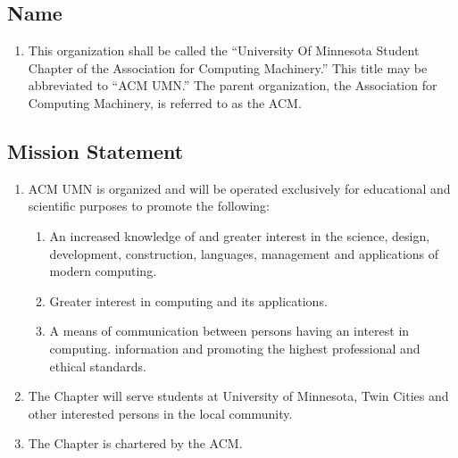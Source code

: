 \subsection{Name}
\begin{enumerate}
	\item This organization shall be called the ``University Of Minnesota Student Chapter of the Association for Computing Machinery.'' This title may be abbreviated to ``ACM UMN.'' The parent organization, the Association for Computing Machinery, is referred to as the ACM.
\end{enumerate}

\subsection{Mission Statement}
\begin{enumerate}
	\item ACM UMN is organized and will be operated exclusively for educational and scientific purposes to promote the following:
		\begin{enumerate}
			\item An increased knowledge of and greater interest in the science, design, development, construction, languages, management and applications of modern computing.
			\item Greater interest in computing and its applications.
			\item A means of communication between persons having an interest in computing. information and promoting the highest professional and ethical standards.
		\end{enumerate}
	\item The Chapter will serve students at University of Minnesota, Twin Cities and other interested persons in the local community.
	\item The Chapter is chartered by the ACM.
\end{enumerate}
